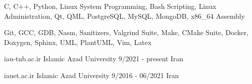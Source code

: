 \documentclass[a4paper,12pt]{memoir} %
\begin{document}


{C, C++, Python, Linux System Programming,
Bash Scripting, Linux Administration, Qt, QML,
PostgreSQL, MySQL, MongoDB, x86\_64 Assembly}


\SmallSep %


{Git, GCC, GDB, Nasm, Sanitizers, Valgrind Suite,
Make, CMake Suite, Docker, Doxygen, Sphinx, UML,
PlantUML, Vim, Latex}


\Sep %




{iau-tnb.ac.ir}
{Islamic Azad University}
{9/2021 - present}
{Iran}

{iauet.ac.ir}
{Islamic Azad University}
{9/2016 - 06/2021}
{Iran}


\Sep %




\end{document}
